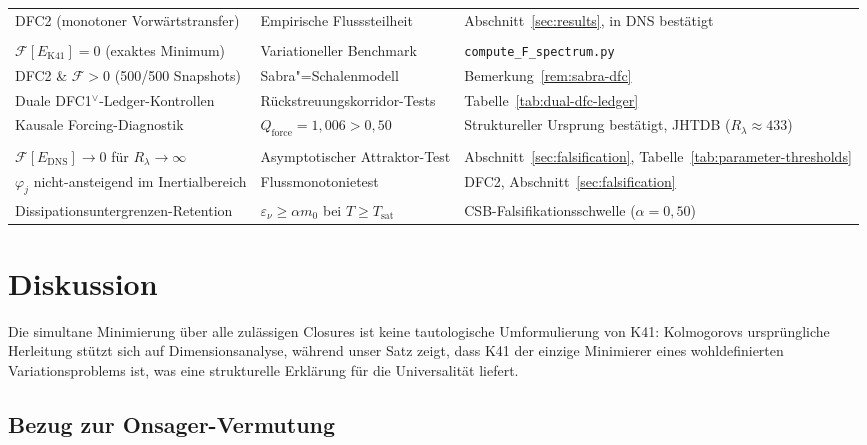 \documentclass[12pt,a4paper]{article}
\theoremstyle{breakdef}
\theoremstyle{breakplain}
\theoremstyle{breakdef}
\begin{document}
\begin{table}[htbp]
\begin{tabularx}{\textwidth}{>{\raggedright\arraybackslash}p{4.2cm} >{\raggedright\arraybackslash}p{3.8cm} Y}
DFC2 (monotoner Vorwärtstransfer) & Empirische Flusssteilheit & Abschnitt~\ref{sec:results}, in DNS bestätigt \\
\addlinespace[4pt]
 \\
\addlinespace[2pt]
$\mathcal{F}[E_{\mathrm{K41}}] = 0$ (exaktes Minimum) & Variationeller Benchmark & \texttt{compute\_F\_spectrum.py} \\
DFC2 \& $\mathcal{F} > 0$ (500/500 Snapshots) & Sabra"=Schalenmodell & Bemerkung~\ref{rem:sabra-dfc} \\
Duale DFC1$^\vee$-Ledger-Kontrollen & Rückstreuungskorridor-Tests & Tabelle~\ref{tab:dual-dfc-ledger} \\
Kausale Forcing-Diagnostik & $Q_{\mathrm{force}} = 1{,}006 > 0{,}50$ & Struktureller Ursprung bestätigt, JHTDB ($R_\lambda \approx 433$) \\
\addlinespace[4pt]
 \\
\addlinespace[2pt]
$\mathcal{F}[E_{\mathrm{DNS}}] \to 0$ für $R_\lambda \to \infty$ & Asymptotischer Attraktor-Test & Abschnitt~\ref{sec:falsification}, Tabelle~\ref{tab:parameter-thresholds} \\
$\varphi_j$ nicht-ansteigend im Inertialbereich & Flussmonotonietest & DFC2, Abschnitt~\ref{sec:falsification} \\
Dissipationsuntergrenzen-Retention & $\varepsilon_\nu \ge \alpha m_0$ bei $T \ge T_{\mathrm{sat}}$ & CSB-Falsifikationsschwelle ($\alpha = 0{,}50$) \\
\bottomrule
\end{tabularx}
\end{table}

\section{Diskussion}\label{sec:discussion}

Die simultane Minimierung über alle zulässigen Closures ist keine tautologische Umformulierung von K41: Kolmogorovs ursprüngliche Herleitung stützt sich auf Dimensionsanalyse, während unser Satz zeigt, dass K41 der einzige Minimierer eines wohldefinierten Variationsproblems ist, was eine strukturelle Erklärung für die Universalität liefert.

\subsection{Bezug zur Onsager-Vermutung}
\end{document}
